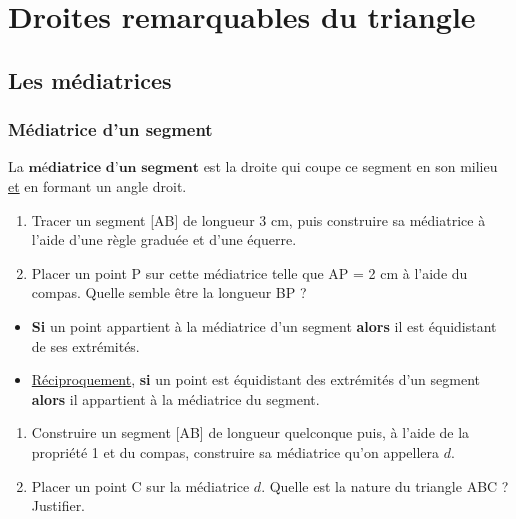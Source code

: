 \documentclass[a4paper]{book}
\begin{document}
\section{Droites remarquables du triangle}
\subsection{Les médiatrices}
\subsubsection{Médiatrice d'un segment}


    \begin{definition}
        La $\textbf{médiatrice d'un segment}$ est la droite qui coupe ce segment en son milieu \underline{et} en formant un angle droit.
    \end{definition}


    \begin{exemple}
        \begin{enumerate}
            \item Tracer un segment [AB] de longueur 3 cm, puis construire sa médiatrice à l'aide d'une règle graduée et d'une équerre.

            \item Placer un point P sur cette médiatrice telle que AP = 2 cm à l'aide du compas. Quelle semble être la longueur BP ? 


            \vspace{2.5cm}
        \end{enumerate}
    \end{exemple}


    \begin{propriete}
        \begin{itemize}
            \item \textbf{Si} un point appartient à la médiatrice d'un segment \textbf{alors} il est équidistant de ses extrémités.

            \item \underline{Réciproquement}, \textbf{si} un point est équidistant des extrémités d'un segment \textbf{alors} il appartient à la médiatrice du segment.
        \end{itemize}
    \end{propriete}


    \begin{exemple}
         \begin{enumerate}
             \item Construire un segment [AB] de longueur quelconque puis, à l'aide de la propriété 1 et du compas, construire sa médiatrice qu'on appellera $d$.

            \item Placer un point C sur la médiatrice $d$. Quelle est la nature du triangle ABC ? Justifier.
         \end{enumerate}
    \end{exemple}
\end{document}
